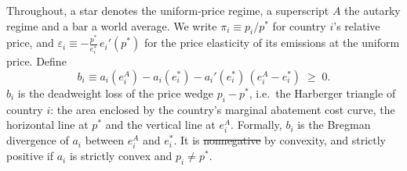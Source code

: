 \documentclass[12pt,english]{article}
\theoremstyle{remark}
\providecommand{\DIFaddtex}[1]{{\protect\color{blue}\uwave{#1}}} %
\providecommand{\DIFdeltex}[1]{{\protect\color{red}\sout{#1}}}                      %
\providecommand{\DIFaddbegin}{} %
\providecommand{\DIFaddend}{} %
\providecommand{\DIFdelbegin}{} %
\providecommand{\DIFdelend}{} %
\providecommand{\DIFadd}[1]{\texorpdfstring{\DIFaddtex{#1}}{#1}} %
\providecommand{\DIFdel}[1]{\texorpdfstring{\DIFdeltex{#1}}{}} %
\newcommand{\DIFscaledelfig}{0.5}
\newlength{\DIFdelgraphicswidth} %
\newlength{\DIFdelgraphicsheight} %
\newcommand{\DIFaddincludegraphics}[2][]{{\color{blue}\fbox{\DIFOincludegraphics[#1]{#2}}}} %
\newcommand{\DIFdelincludegraphics}[2][]{%
\sbox{\DIFdelgraphicsbox}{\DIFOincludegraphics[#1]{#2}}%
\settoboxwidth{\DIFdelgraphicswidth}{\DIFdelgraphicsbox} %
\settoboxtotalheight{\DIFdelgraphicsheight}{\DIFdelgraphicsbox} %
\scalebox{\DIFscaledelfig}{%
\parbox[b]{\DIFdelgraphicswidth}{\usebox{\DIFdelgraphicsbox}\\[-\baselineskip] \rule{\DIFdelgraphicswidth}{0em}}\llap{\resizebox{\DIFdelgraphicswidth}{\DIFdelgraphicsheight}{%
\setlength{\unitlength}{\DIFdelgraphicswidth}%
\begin{picture}(1,1)%
\thicklines\linethickness{2pt} %
{\color[rgb]{1,0,0}\put(0,0){\framebox(1,1){}}}%
{\color[rgb]{1,0,0}\put(0,0){\line( 1,1){1}}}%
{\color[rgb]{1,0,0}\put(0,1){\line(1,-1){1}}}%
\end{picture}%
}\hspace*{3pt}}} %
} %
\DeclareRobustCommand{\DIFaddbegin}{\DIFOaddbegin \let\includegraphics\DIFaddincludegraphics} %
\DeclareRobustCommand{\DIFaddend}{\DIFOaddend \let\includegraphics\DIFOincludegraphics} %
\DeclareRobustCommand{\DIFdelbegin}{\DIFOdelbegin \let\includegraphics\DIFdelincludegraphics} %
\DeclareRobustCommand{\DIFdelend}{\DIFOaddend \let\includegraphics\DIFOincludegraphics} %
\begin{document}
Throughout, a star denotes the uniform-price regime, a superscript $A$ the autarky regime and a bar a world average.
We write $\pi_i \equiv p_i/p^*$ for country $i$'s relative price, and $\varepsilon_i \equiv -\frac{p^*}{e^*_i}\,e_i'(p^*)$ for the price elasticity of its emissions at the uniform price. Define
\begin{equation}
  b_i \equiv a_i(e^A_i) - a_i(e^*_i) - a_i'(e^*_i)\,(e^A_i-e^*_i) \;\geq\; 0.
  \label{eq:bregman}
\end{equation}
$b_i$ is the deadweight loss of the price wedge $p_i - p^*$, i.e.\ the Harberger triangle of country $i$: %
the area enclosed by the country's marginal abatement cost curve, the horizontal line at $p^*$ and the vertical line at $e^A_i$. %
Formally, $b_i$ is the Bregman divergence of $a_i$ between $e^A_i$ and $e^*_i$. It is \DIFdelbegin \DIFdel{nonnegative }\DIFdelend \DIFaddbegin \DIFadd{non-negative }\DIFaddend by convexity, and strictly positive if $a_i$ is strictly convex and $p_i\neq p^*$.
\end{document}
